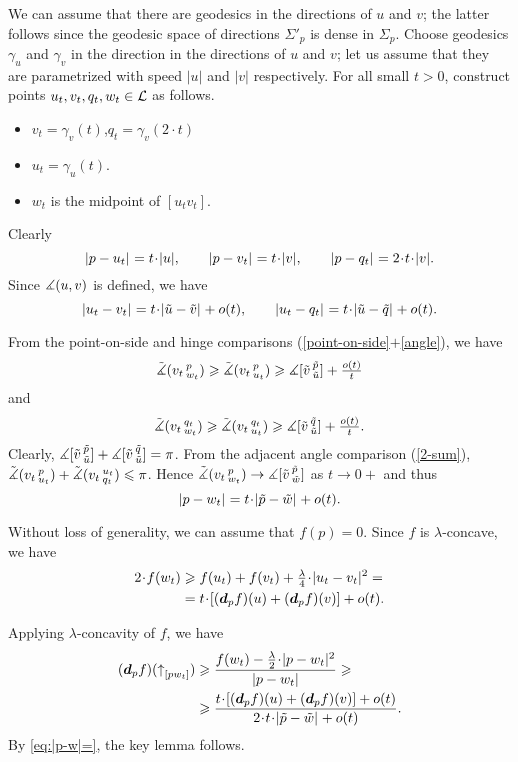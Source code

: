 We can assume that there are geodesics in the directions of $u$ and $v$;
the latter follows since the geodesic space of directions $\Sigma'_p$ is dense in $\Sigma_p$.
Choose geodesics $\gamma_u$ and $\gamma_v$ in the direction in the directions of $u$ and $v$;
let us assume that they are parametrized with speed $|u|$ and $|v|$ respectively.
For all small $t>0$, construct points $u_t,v_t,q_t,w_t\in \mathcal{L}$ as follows.
\begin{itemize}
\item $v_t=\gamma_v(t)$,\quad  $q_t=\gamma_v(2\cdot t)$
\item $u_t=\gamma_u(t)$.
\item $w_t$ is the midpoint of $[u_t v_t]$.
\end{itemize}
Clearly 
\[\dist{p}{u_t}{}=t\cdot |u|,\qquad \dist{p}{v_t}{}=t\cdot|v|,\qquad \dist{p}{q_t}{}=2\cdot t\cdot|v|.\] 
Since $\measuredangle(u,v)$ is defined, 
we have 
\[\dist{u_t}{v_t}{}=t\cdot\dist{\tilde u}{\tilde v}{}+o(t),
\qquad
\dist{u_t}{q_t}{}=t\cdot\dist{\tilde u}{\tilde q}{}+o(t).\]

From the point-on-side and hinge comparisons (\ref{point-on-side}$+$\ref{angle}), we have
\[\tilde\measuredangle(v_t\,{}^{p}_{w_t})
\geqslant
\tilde\measuredangle(v_t\,{}^{p}_{u_t})
\geqslant
\measuredangle[\tilde v\,{}^{\tilde p}_{\tilde u}]+\tfrac{o(t)}t\]
and
\[\tilde\measuredangle(v_t\,{}^{q_t}_{w_t})
\geqslant
\tilde\measuredangle(v_t\,{}^{q_t}_{u_t})
\geqslant
\measuredangle[\tilde v\,{}^{\tilde q}_{\tilde u}]+\tfrac{o(t)}t.\]
Clearly, 
$\measuredangle[\tilde v\,{}^{\tilde p}_{\tilde u}]+\measuredangle[\tilde v\,{}^{\tilde q}_{\tilde u}]=\pi$. 
From the adjacent angle comparison (\ref{2-sum}), 
$\angk{v_t}p{u_t}\z+\angk{v_t}{u_t}{q_t}\le \pi$.
Hence
$\tilde\measuredangle(v_t\,{}^{p}_{w_t})
\to
\measuredangle[\tilde v\,{}^{\tilde p}_{\tilde w}]$ as $t\to0+$
and thus 
\[\dist{p}{w_t}{}=t\cdot\dist{\tilde p}{\tilde w}{}+o(t).\]

Without loss of generality, we can assume that $f(p)=0$.
Since $f$ is $\lambda$-concave, we have 
\begin{align*}
2\cdot f(w_t)&\ge f(u_t)+f(v_t)+\tfrac\lambda4\cdot\dist[2]{u_t}{v_t}{}=
\\
&=t\cdot [(\dd_p f)(u)+(\dd_p f)(v)]+o(t).
\end{align*}
 
Applying $\lambda$-concavity of $f$, we have
\begin{align*}
(\dd_p f)(\dir p{w_t})
&\ge 
\frac{f(w_t)-\tfrac\lambda2\cdot |p-w_t|^2}{|p-w_t|}
\ge 
\\
&\ge
\frac{t\cdot[(\dd_p f)(u)+(\dd_p f)(v)]
+o(t)}{2\cdot t\cdot\dist[{{}}]{\tilde p}{\tilde w}{}+o(t)}.
\end{align*}
By \ref{eq:|p-w|=}, the key lemma follows.
\qeds

